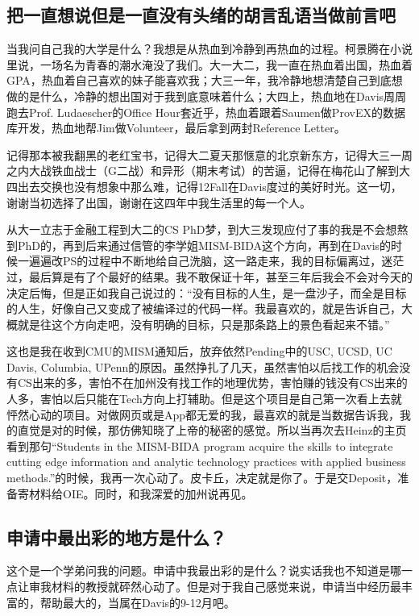 \subsection{把一直想说但是一直没有头绪的胡言乱语当做前言吧}
当我问自己我的大学是什么？我想是从热血到冷静到再热血的过程。柯景腾在小说里说，一场名为青春的潮水淹没了我们。大一大二，我一直在热血着出国，热血着GPA，热血着自己喜欢的妹子能喜欢我；大三一年，我冷静地想清楚自己到底想做的是什么，冷静的想出国对于我到底意味着什么；大四上，热血地在Davis周周跑去Prof. Ludaescher的Office Hour套近乎，热血着跟着Saumen做ProvEX的数据库开发，热血地帮Jim做Volunteer，最后拿到两封Reference Letter。\par
记得那本被我翻黑的老红宝书，记得大二夏天那惬意的北京新东方，记得大三一周之内大战铁血战士（G二战）和异形（期末考试）的苦逼，记得在梅花山了解到大四出去交换也没有想象中那么难，记得12Fall在Davis度过的美好时光。这一切，谢谢当初选择了出国，谢谢在这四年中我生活里的每一个人。\par
从大一立志于金融工程到大二的CS PhD梦，到大三发现应付了事的我是不会想熬到PhD的，再到后来通过信管的李学姐MISM-BIDA这个方向，再到在Davis的时候一遍遍改PS的过程中不断地给自己洗脑，这一路走来，我的目标偏离过，迷茫过，最后算是有了个最好的结果。我不敢保证十年，甚至三年后我会不会对今天的决定后悔，但是正如我自己说过的：“没有目标的人生，是一盘沙子，而全是目标的人生，好像自己又变成了被编译过的代码一样。我最喜欢的，就是告诉自己，大概就是往这个方向走吧，没有明确的目标，只是那条路上的景色看起来不错。”\par
这也是我在收到CMU的MISM通知后，放弃依然Pending中的USC, UCSD, UC Davis, Columbia, UPenn的原因。虽然挣扎了几天，虽然害怕以后找工作的机会没有CS出来的多，害怕不在加州没有找工作的地理优势，害怕赚的钱没有CS出来的人多，害怕以后只能在Tech方向上打辅助。但是这个项目是自己第一次看上去就怦然心动的项目。对做网页或是App都无爱的我，最喜欢的就是当数据告诉我，我的直觉是对的时候，那仿佛知晓了上帝的秘密的感觉。所以当再次去Heinz的主页看到那句“Students in the MISM-BIDA program acquire the skills to integrate cutting edge information and analytic technology practices with applied business methods.”的时候，我再一次心动了。皮卡丘，决定就是你了。于是交Deposit，准备寄材料给OIE。同时，和我深爱的加州说再见。\par
\subsection{申请中最出彩的地方是什么？}
这个是一个学弟问我的问题。申请中我最出彩的是什么？说实话我也不知道是哪一点让审我材料的教授就砰然心动了。但是对于我自己感觉来说，申请当中经历最丰富的，帮助最大的，当属在Davis的9-12月吧。\par
